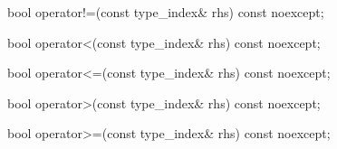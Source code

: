 \begin{itemdescr}
\pnum
\returns {}
\end{itemdescr}

%
%
\begin{itemdecl}
bool operator!=(const type_index& rhs) const noexcept;
\end{itemdecl}

\begin{itemdescr}
\pnum
\returns {}
\end{itemdescr}

%
%
\begin{itemdecl}
bool operator<(const type_index& rhs) const noexcept;
\end{itemdecl}

\begin{itemdescr}
\pnum
\returns {}
\end{itemdescr}

%
%
\begin{itemdecl}
bool operator<=(const type_index& rhs) const noexcept;
\end{itemdecl}

\begin{itemdescr}
\pnum
\returns {}
\end{itemdescr}

%
%
\begin{itemdecl}
bool operator>(const type_index& rhs) const noexcept;
\end{itemdecl}

\begin{itemdescr}
\pnum
\returns {}
\end{itemdescr}

%
%
\begin{itemdecl}
bool operator>=(const type_index& rhs) const noexcept;
\end{itemdecl}

